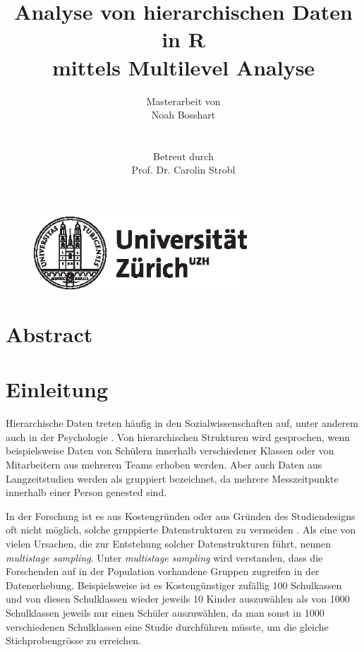 \documentclass[12pt]{article}\usepackage[]{graphicx}\usepackage[]{color}
\title{Analyse von hierarchischen Daten in R \\ mittels Multilevel Analyse}
\author{Masterarbeit von \\ Noah Bosshart \\ \\ \\ Betreut durch \\ Prof. Dr. Carolin Strobl}
\begin{document}
\begin{figure}[t]
  \centering
  \includegraphics[width = 8cm]{uzh_logo}
\end{figure}

\maketitle

\newpage
\tableofcontents

\newpage
\section{Abstract}

\newpage

\section{Einleitung}
Hierarchische Daten treten häufig in den Sozialwissenschaften auf, unter anderem auch in der Psychologie \citep{SnijdersTomA.B2012Ma:a}. Von hierarchischen Strukturen wird gesprochen, wenn beispielsweise Daten von Schülern innerhalb verschiedener Klassen oder von Mitarbeitern aus mehreren Teams erhoben werden. Aber auch Daten aus Langzeitstudien werden als gruppiert bezeichnet, da mehrere Messzeitpunkte innerhalb einer Person genested sind. 


In der Forschung ist es aus Kostengründen oder aus Gründen des Studiendesigns oft nicht möglich, solche gruppierte Datenstrukturen zu vermeiden \citep{SnijdersTomA.B2012Ma:a, woltman2012introduction}. Als eine von vielen Ursachen, die zur Entstehung solcher Datenstrukturen führt, nennen \cite{SnijdersTomA.B2012Ma:a} \textit{multistage sampling}. Unter \textit{multistage sampling} wird verstanden, dass die Forschenden auf in der Population vorhandene Gruppen zugreifen in der Datenerhebung. Beispielsweise ist es Kostengünstiger zufällig 100 Schulkassen und von diesen Schulklassen wieder jeweils 10 Kinder auszuwählen als von 1000 Schulklassen jeweils nur einen Schüler auszuwählen, da man sonst in 1000 verschiedenen Schulklassen eine Studie durchführen müsste, um die gleiche Stichprobengrösse zu erreichen. 
\end{document}
